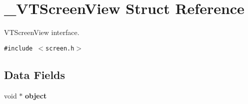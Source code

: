 \section{\_\-VTScreen\-View Struct Reference}
\label{struct__VTScreenView}
VTScreen\-View interface. 


{\tt \#include $<$screen.h$>$}

\subsection*{Data Fields}
\begin{CompactItemize}
\item 
{}
void $\ast$ {\bf object}\label{struct__VTScreenView_m0}


\end{CompactItemize}
